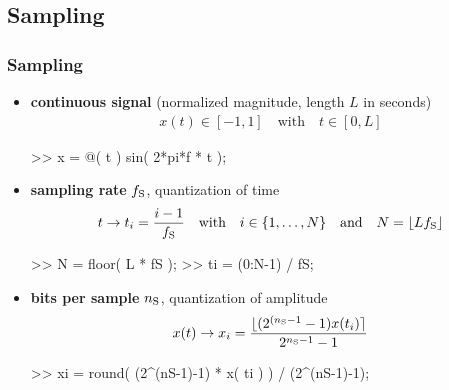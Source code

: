 
\subsection{Sampling}

\begin{frame}[fragile] %
	\frametitle{Sampling}
	\begin{itemize}
		\item \textbf{continuous signal} (normalized magnitude, length $L$ in seconds)
			\begin{align*}
				x(t)\in[-1,1]\quad\textrm{with}\quad t\in[0,L]
			\end{align*}
			\begin{code}
>> x = @( t ) sin( 2*pi*f * t ); \color{medium}%
			\end{code}
		\item \textbf{sampling rate} $f_{\textrm S}$, quantization of time
			\begin{align*}
				t\rightarrow t_i=\frac{i-1}{f_{\textrm S}}\quad\textrm{with}\quad i\in\{1,\ldots,N\}\quad\textrm{and}\quad N=\lfloor Lf_{\textrm S}\rfloor
			\end{align*}
			\begin{code}
>> N = floor( L * fS ); \color{medium}%
>> ti = (0:N-1) / fS; \color{medium}%
			\end{code}
		\item \textbf{bits per sample} $n_{\textrm S}$, quantization of amplitude
			\begin{align*}
				x(t)\rightarrow x_i=\frac{\lfloor(2^{(n_{\textrm S}-1}-1)x(t_i)\rceil}{2^{n_{\textrm S}-1}-1}
			\end{align*}
			\begin{code}
>> xi = round( (2^(nS-1)-1) * x( ti ) ) / (2^(nS-1)-1); \color{medium}%
			\end{code}
	\end{itemize}
\end{frame}


